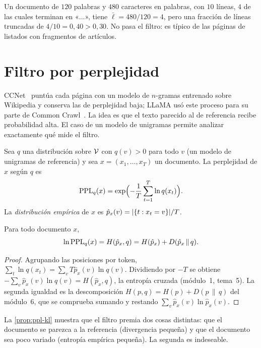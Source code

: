 \begin{ejemplo}\label{ej:gopher}
Un documento de $120$ palabras y $480$ caracteres en palabras, con $10$ líneas, $4$ de las cuales terminan en «...», tiene $\bar{\ell}=480/120=4$, pero una fracción de líneas truncadas de $4/10=0{,}40>0{,}30$. No pasa el filtro: es típico de las páginas de listados con fragmentos de artículos.
\end{ejemplo}

\section{Filtro por perplejidad}

CCNet~\cite{wenzek} puntúa cada página con un modelo de $n$-gramas entrenado sobre Wikipedia y conserva las de perplejidad baja; LLaMA usó este proceso para su parte de Common Crawl~\cite[§2.1]{llama}. La idea es que el texto parecido al de referencia recibe probabilidad alta. El caso de un modelo de unigramas permite analizar exactamente qué mide el filtro.

\begin{definicion}
Sea $q$ una distribución sobre $\mathcal{V}$ con $q(v)>0$ para todo $v$ (un modelo de unigramas de referencia) y sea $x=(x_1,\dots,x_T)$ un documento. La perplejidad de $x$ según $q$ es
\[
\operatorname{PPL}_q(x)=\exp\Bigl(-\frac1T\sum_{t=1}^{T}\ln q(x_t)\Bigr).
\]
La \emph{distribución empírica} de $x$ es $\hat p_x(v)=\lvert\{t:x_t=v\}\rvert/T$.
\end{definicion}

\begin{proposicion}\label{prop:ppl-kl}
Para todo documento $x$,
\[
\ln\operatorname{PPL}_q(x)=H(\hat p_x,q)=H(\hat p_x)+D(\hat p_x\,\|\,q).
\]
\end{proposicion}

\begin{proof}
Agrupando las posiciones por token, $\sum_{t}\ln q(x_t)=\sum_{v}T\hat p_x(v)\ln q(v)$. Dividiendo por $-T$ se obtiene $-\sum_v\hat p_x(v)\ln q(v)=H(\hat p_x,q)$, la entropía cruzada (módulo~1, tema~5). La segunda igualdad es la descomposición $H(p,q)=H(p)+D(p\,\|\,q)$ del módulo~6, que se comprueba sumando y restando $\sum_v\hat p_x(v)\ln\hat p_x(v)$.
\end{proof}

La \cref{prop:ppl-kl} muestra que el filtro premia dos cosas distintas: que el documento se parezca a la referencia (divergencia pequeña) y que el documento sea poco variado (entropía empírica pequeña). La segunda es indeseable.

